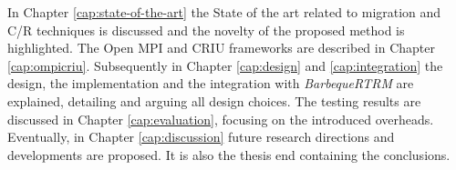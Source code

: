 In Chapter \ref{cap:state-of-the-art} the State of the art related to
migration and C/R techniques is discussed and the novelty of the
proposed method is highlighted. The Open MPI and CRIU frameworks are
described in Chapter \ref{cap:ompicriu}. Subsequently in Chapter
\ref{cap:design} and \ref{cap:integration} the design, the implementation and the integration with
\emph{BarbequeRTRM} are explained, detailing and arguing all design choices.
The testing results are discussed in Chapter \ref{cap:evaluation}, focusing on
the introduced overheads. Eventually, in Chapter \ref{cap:discussion} future
research directions and developments are proposed. It is also the thesis end containing the conclusions.   
\fi
